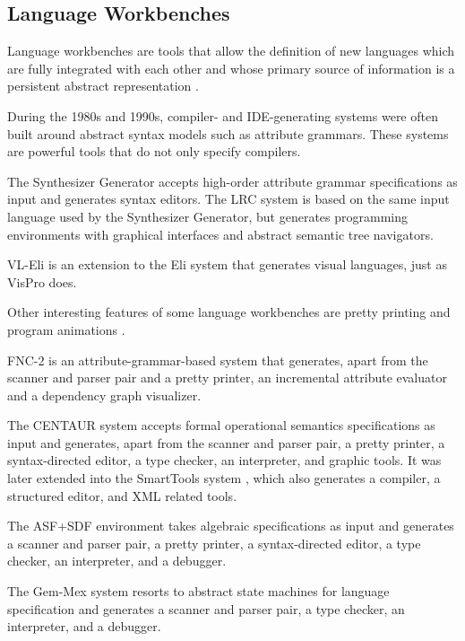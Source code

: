 \documentclass[preprint]{elsarticle}
\begin{document}
\subsection{Language Workbenches} \label{subsec:workbenches}

Language workbenches are tools that allow the definition of new languages which are fully integrated with each other and whose primary source of information is a persistent abstract representation \cite{language-workbenches}.

During the 1980s and 1990s, compiler- and IDE-generating systems were often built around abstract syntax models such as attribute grammars.
These systems are powerful tools that do not only specify compilers.

The Synthesizer Generator \cite{Reps1989} accepts high-order attribute grammar specifications as input and generates syntax editors.
The LRC system \cite{Kuiper1998} is based on the same input language used by the Synthesizer Generator, but generates programming environments with graphical interfaces and abstract semantic tree navigators.

VL-Eli \cite{Kastens2002} is an extension to the Eli system \cite{Kastens1998} that generates visual languages, just as VisPro \cite{Zhang1998} does.

Other interesting features of some language workbenches are pretty printing \cite{Swierstra1998} and program animations \cite{Saraiva2002}.

FNC-2 \cite{Jourdan2002} is an attribute-grammar-based system that generates, apart from the scanner and parser pair and a pretty printer, an incremental attribute evaluator and a dependency graph visualizer.

The CENTAUR system \cite{Borras1988} accepts formal operational semantics specifications as input and generates, apart from the scanner and parser pair, a pretty printer, a syntax-directed editor, a type checker, an interpreter, and graphic tools.
It was later extended into the SmartTools system \cite{Attali2001}, which also generates a compiler, a structured editor, and XML related tools.

The ASF+SDF environment \cite{Brand2001} takes algebraic specifications as input and generates a scanner and parser pair, a pretty printer, a syntax-directed editor, a type checker, an interpreter, and a debugger.

The Gem-Mex system \cite{Anlauff1998} resorts to abstract state machines for language specification and generates a scanner and parser pair, a type checker, an interpreter, and a debugger.
\end{document}
